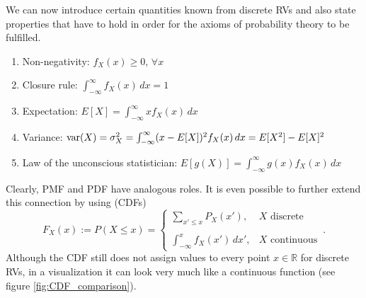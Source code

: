 We can now introduce certain quantities known from discrete RVs and also state properties that have to hold in order for the axioms of probability theory to be fulfilled.
\begin{prop}
\begin{enumerate}
\item Non-negativity: $f_X(x) \geq 0, \, \forall x$

\item Closure rule: $\int_{- \infty}^\infty f_X(x) \, dx = 1$

\item Expectation: $E[X] = \int_{- \infty}^\infty x f_X(x) \, dx$

\item Variance: $\operatorname{var}(X) = \sigma_X^2 = \int_{- \infty}^\infty (x - E[X])^2 f_X(x) \, dx = E[X^2] - E[X]^2$

\item Law of the unconscious statistician\footnotemark{}: $E[g(X)] = \int_{-\infty}^\infty g(x) f_X(x) \, dx$
\end{enumerate}
\end{prop}
Clearly, PMF and PDF have analogous roles. It is even possible to further extend this connection by using  (CDFs)
\begin{equation}
F_X(x) := P(X \leq x) = \begin{cases} \displaystyle \sum_{x' \leq x} P_X(x'), & X \text{ discrete} \\\\ \displaystyle \int_{- \infty}^x f_X(x') \, dx', & X \text{ continuous} \end{cases} \, .
\end{equation}
Although the CDF still does not assign values to every point $x \in \mathbb{R}$ for discrete RVs, in a visualization it can look very much like a continuous function (see figure \ref{fig:CDF_comparison}).



